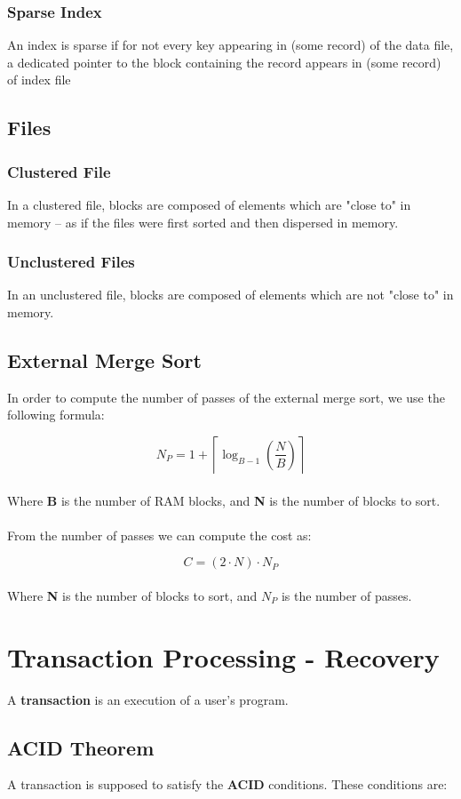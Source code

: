\documentclass{article}
\begin{document}
\subsubsection{Sparse Index}
An index is sparse if for not every key appearing in (some record) of the data file, a dedicated pointer to the block containing the record appears in (some record) of index file

\subsection{Files}
\subsubsection{Clustered File}
In a clustered file, blocks are composed of elements which are "close to" in memory -- as if the files were first sorted and then dispersed in memory.

\subsubsection{Unclustered Files}
In an unclustered file, blocks are composed of elements which are not "close to" in memory.

\subsection{External Merge Sort}
In order to compute the number of passes of the external merge sort, we use the following formula:

\[ N_P = 1 + \left\lceil \log_{B-1}\left(\frac{N}{B}\right) \right\rceil \] \\
Where \textbf{B} is the number of RAM blocks, and \textbf{N} is the number of blocks to sort. \\ \\
From the number of passes we can compute the cost as:

\[ C = (2 \cdot N) \cdot N_P \] \\
Where \textbf{N} is the number of blocks to sort, and $N_P$ is the number of passes.

\section{Transaction Processing - Recovery}
A \textbf{transaction} is an execution of a user's program.

\subsection{ACID Theorem}
A transaction is supposed to satisfy the \textbf{ACID} conditions. These conditions are:
\end{document}

